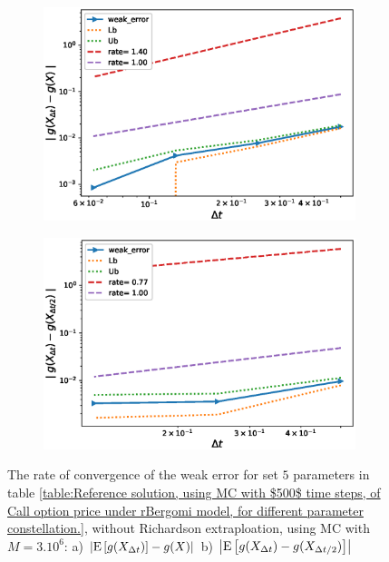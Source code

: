 \documentclass[11pt]{article}
\newcommand{\expt}[1]{\mathrm{E}\left[#1\right]}
\begin{document}
\FloatBarrier

\begin{figure}[!htb]
	\centering
	\begin{subfigure}{.4\textwidth}
		\centering
		\includegraphics[width=1\linewidth]{./figures/rBergomi_weak_error_rates/without_richardson/H_002/weak_convergence_order_Bergomi_H_002_K_1_M_3_10_6_CI_relative}
		\caption{}
		\label{fig:sub3}
	\end{subfigure}%
	\begin{subfigure}{.4\textwidth}
		\centering
		\includegraphics[width=1\linewidth]{./figures/rBergomi_weak_error_rates/without_richardson/H_002/weak_convergence_order_differences_Bergomi_H_002_K_1_M_3_10_6_CI_relative}
		\caption{}
		\label{fig:sub4}
	\end{subfigure}
	
	\caption{The rate of convergence of the weak error for set $5$ parameters in table \ref{table:Reference solution, using MC with $500$ time steps, of Call option price under rBergomi model, for different parameter constellation.}, without Richardson extraploation, using MC with $M=3.10^6$: a) $\abs{\expt{g(X_{\Delta t})}-g(X)}$  b) $\abs{\expt{g(X_{\Delta t})-g(X_{\Delta t/2})}}$ }
	\label{fig:Weak_rate_H_002_without_rich_K_1}
\end{figure}
\end{document}
